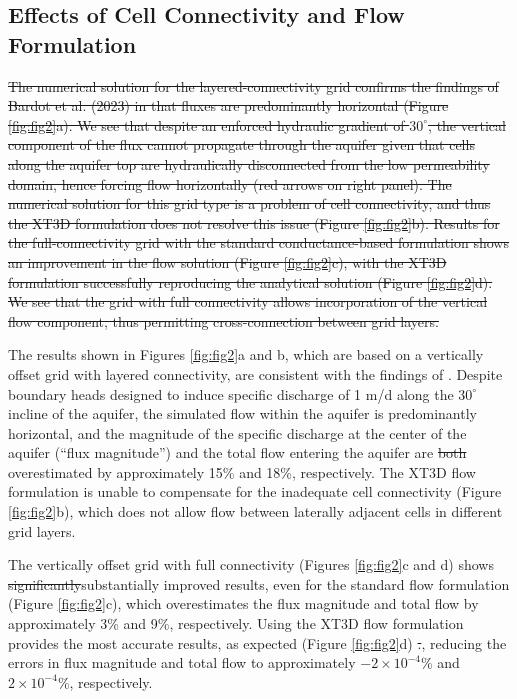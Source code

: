 \documentclass{article}
\begin{document}
\subsection*{Effects of Cell Connectivity and Flow Formulation}

{\color{red} \sout{The numerical solution for the layered-connectivity grid confirms the findings of Bardot et al. (2023) in that fluxes are predominantly horizontal (Figure \ref{fig:fig2}a). We see that despite an enforced hydraulic gradient of $30^{\circ}$, the vertical component of the flux cannot propagate through the aquifer given that cells along the aquifer top are hydraulically disconnected from the low permeability domain, hence forcing flow horizontally (red arrows on right panel). The numerical solution for this grid type is a problem of cell connectivity, and thus the XT3D formulation does not resolve this issue (Figure \ref{fig:fig2}b). Results for the full-connectivity grid with the standard conductance-based formulation shows an improvement in the flow solution (Figure \ref{fig:fig2}c), with the XT3D formulation successfully reproducing the analytical solution (Figure \ref{fig:fig2}d). We see that the grid with full connectivity allows incorporation of the vertical flow component, thus permitting cross-connection between grid layers.}}

The results shown in Figures \ref{fig:fig2}a and b, which are based on a vertically offset grid with layered connectivity, are consistent with the findings of \cite{bardot2023}. Despite boundary heads designed to induce specific discharge of 1 m/d along the $30^{\circ}$ incline of the aquifer, the simulated flow within the aquifer is predominantly horizontal, and the magnitude of the specific discharge at the center of the aquifer {\color{red} (``flux magnitude'')} and the total flow entering the aquifer are {\color{red} \sout{both}} overestimated {\color{red}by approximately 15\% and 18\%, respectively}. The XT3D flow formulation is unable to compensate for the inadequate cell connectivity (Figure \ref{fig:fig2}b), which does not allow flow between laterally adjacent cells in different grid layers.

The vertically offset grid with full connectivity (Figures \ref{fig:fig2}c and d) shows {\color{red} \sout{significantly}substantially} improved results, even for the standard flow formulation (Figure \ref{fig:fig2}c){\color{red}, which overestimates the flux magnitude and total flow by approximately 3\% and 9\%, respectively.} Using the XT3D flow formulation provides the most accurate results, as expected (Figure \ref{fig:fig2}d){\color{red} \sout{.}, reducing the errors in flux magnitude and total flow to approximately $-2 \times 10^{-4}$\% and $2 \times 10^{-4}$\%, respectively.}
\end{document}
